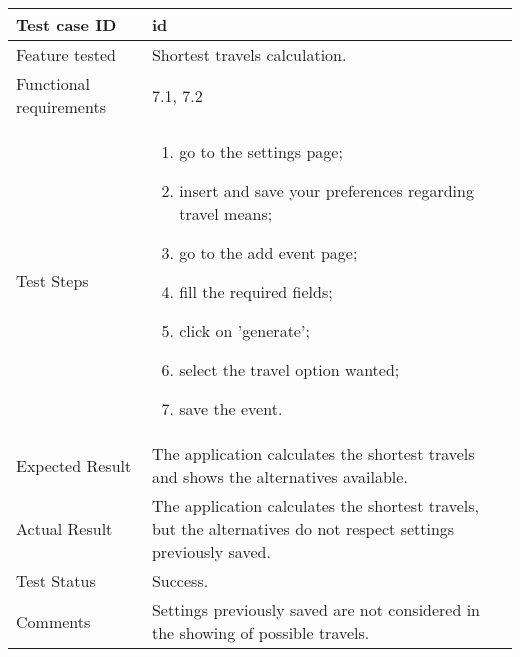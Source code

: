 \begin{table}[H]
	\begin{center}
		\begin{tabular}{ | p{} | p{} | }
		\hline
		Test case ID & id\\
		\hline
		Feature tested & Shortest travels calculation.\\
    	\hline
		Functional requirements & 7.1, 7.2  \\
		\hline
		Test Steps & 
			\begin{enumerate}
			\item go to the settings page;
			\item insert and save your preferences regarding travel means;
				\item go to the add event page;
				\item fill the required fields;
				\item click on 'generate';
				\item select the travel option wanted;
				\item save the event.
			\end{enumerate} \\
		\hline
		Expected Result & The application calculates the shortest travels and shows the alternatives available.\\
		\hline
		Actual Result & The application calculates the shortest travels, but the alternatives do not respect settings previously saved.\\ 
		\hline
		Test Status & \color{ForestGreen}Success.\\ 
		\hline
		Comments & Settings previously saved are not considered in the showing of possible travels.\\ 
		\hline
		
		\end{tabular}
	\end{center}
\end{table}

